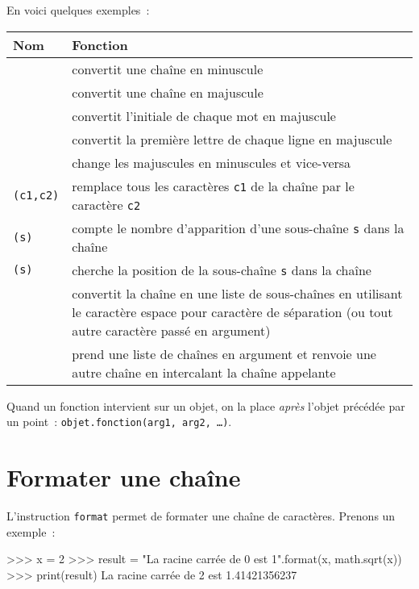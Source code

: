 En voici quelques exemples~:
\begin{center}
\tabulinesep=1.5mm
\begin{tabu}to0.9\linewidth{|X[1,l]|X[3,l]|}
\hline
\textbf{Nom} & \textbf{Fonction}\\
\hline
{} & convertit une chaîne en minuscule\\
\hline
{} & convertit une chaîne en majuscule\\
\hline
{} & convertit l'initiale de chaque mot en majuscule\\
\hline
{} & convertit la première lettre de chaque ligne en majuscule\\
\hline
{} & change les majuscules en minuscules et vice-versa\\
\hline
{}\texttt{(c1,c2)} &
remplace tous les caractères \texttt{c1} de la chaîne par le caractère \texttt{c2}\\
\hline
{}\texttt{(s)} & compte le nombre d'apparition d'une sous-chaîne \texttt{s} dans la chaîne\\
\hline
{}\texttt{(s)} & cherche la position de la sous-chaîne \texttt{s} dans la chaîne\\
\hline
{} & convertit la chaîne en une liste de sous-chaînes en utilisant le caractère espace pour
        caractère de séparation (ou tout autre caractère passé en argument)\\
\hline
{} & prend une liste de chaînes en argument et renvoie une autre chaîne en intercalant
       la chaîne appelante\\
\hline
\end{tabu}
\end{center}

Quand un fonction intervient sur un objet, on la place \textit{après} l'objet précédée par un point~: \texttt{objet.fonction(arg1, arg2, \dots)}.


\section{Formater une chaîne}
\label{python:caracteres:format}
L'instruction \texttt{format} permet de formater une chaîne de caractères.  Prenons un exemple~:
\begin{pythoncode}
>>> x = 2
>>> result = "La racine carrée de {0} est {1}".format(x, math.sqrt(x))
>>> print(result)
La racine carrée de 2 est 1.41421356237
\end{pythoncode}

